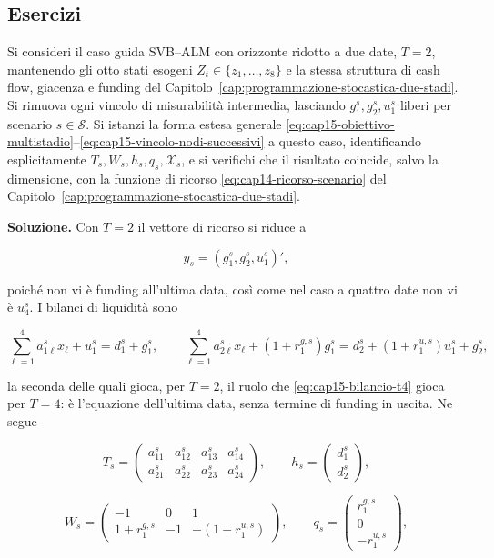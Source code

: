 \subsection{Esercizi}

\begin{exercise}[Il caso SVB--ALM con orizzonte ridotto a $T=2$]

\label{ex:cap15-svb-t2}

Si consideri il caso guida SVB--ALM con orizzonte ridotto a due date,
$T=2$, mantenendo gli otto stati esogeni $Z_t\in\{z_1,\ldots,z_8\}$ e la
stessa struttura di cash flow, giacenza e funding del
Capitolo~\ref{cap:programmazione-stocastica-due-stadi}. Si rimuova ogni
vincolo di misurabilit\`a intermedia, lasciando $g_1^s,g_2^s,u_1^s$ liberi
per scenario $s\in\mathcal S$. Si istanzi la forma estesa generale
\eqref{eq:cap15-obiettivo-multistadio}--\eqref{eq:cap15-vincolo-nodi-successivi}
a questo caso, identificando esplicitamente $T_s,W_s,h_s,q_s,\mathcal X_s$, e
si verifichi che il risultato coincide, salvo la dimensione, con la
funzione di ricorso \eqref{eq:cap14-ricorso-scenario} del
Capitolo~\ref{cap:programmazione-stocastica-due-stadi}.

\end{exercise}

\noindent\textbf{Soluzione.} Con $T=2$ il vettore di ricorso si riduce a

\[
y_s=(g_1^s,g_2^s,u_1^s)',
\]

poich\'e non vi \`e funding all'ultima data, cos\`i come nel caso a quattro
date non vi \`e $u_4^s$. I bilanci di liquidit\`a sono

\[
\sum_{\ell=1}^{4}a_{1\ell}^sx_\ell+u_1^s=d_1^s+g_1^s,
\qquad
\sum_{\ell=1}^{4}a_{2\ell}^sx_\ell+(1+r_1^{g,s})g_1^s
=
d_2^s+(1+r_1^{u,s})u_1^s+g_2^s,
\]

la seconda delle quali gioca, per $T=2$, il ruolo che
\eqref{eq:cap15-bilancio-t4} gioca per $T=4$: \`e l'equazione dell'ultima
data, senza termine di funding in uscita. Ne segue

\[
T_s=
\begin{pmatrix}
a_{11}^s&a_{12}^s&a_{13}^s&a_{14}^s\\
a_{21}^s&a_{22}^s&a_{23}^s&a_{24}^s
\end{pmatrix},
\qquad
h_s=
\begin{pmatrix}
d_1^s\\d_2^s
\end{pmatrix},
\]

\[
W_s=
\begin{pmatrix}
-1&0&1\\
1+r_1^{g,s}&-1&-(1+r_1^{u,s})
\end{pmatrix},
\qquad
q_s=
\begin{pmatrix}
r_1^{g,s}\\0\\-r_1^{u,s}
\end{pmatrix},
\]

